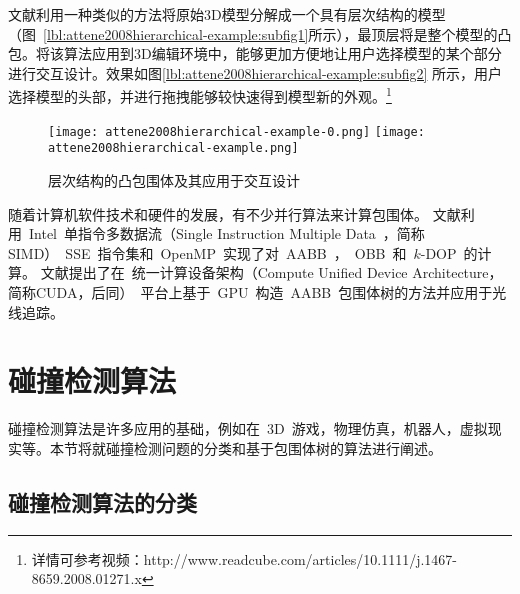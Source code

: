 文献利用一种类似的方法将原始3D模型分解成一个具有层次结构的模型（图~\ref{lbl:attene2008hierarchical-example:subfig1}所示），最顶层将是整个模型的凸包。将该算法应用到3D编辑环境中，能够更加方便地让用户选择模型的某个部分进行交互设计。效果如图\ref{lbl:attene2008hierarchical-example:subfig2} 所示，用户选择模型的头部，并进行拖拽能够较快速得到模型新的外观。\footnote{详情可参考视频：http://www.readcube.com/articles/10.1111/j.1467-8659.2008.01271.x }
\begin{figure}[H]
  \centering
    {\texttt{[image: attene2008hierarchical-example-0.png]}}
    {\texttt{[image: attene2008hierarchical-example.png]}}
  \caption{层次结构的凸包围体及其应用于交互设计\cite{attene2008hierarchical}}
  \label{lbl:attene2008hierarchical-example}
\end{figure}

随着计算机软件技术和硬件的发展，有不少并行算法来计算包围体。
文献利用~Intel~单指令多数据流（Single Instruction
Multiple Data~，简称SIMD）~SSE~指令集和~OpenMP~实现了对~AABB~，~OBB~和~$k$-DOP~的计算。
文献提出了在~统一计算设备架构（Compute Unified Device
Architecture，简称CUDA，后同）~平台上基于~GPU~构造~AABB~包围体树的方法并应用于光线追踪。

\section{碰撞检测算法}
\label{sec:collisiondetection}

碰撞检测算法是许多应用的基础，例如在~3D~游戏，物理仿真，机器人，虚拟现实等。本节将就碰撞检测问题的分类和基于包围体树的算法进行阐述。

\subsection{碰撞检测算法的分类}
\label{sec:cd-category}

